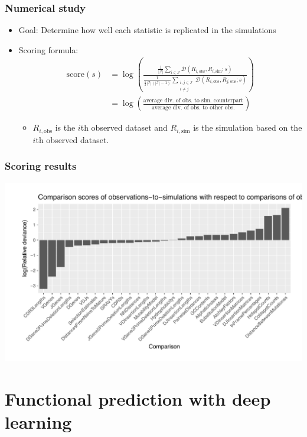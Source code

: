 \documentclass[mathserif,compress]{beamer}
\newcommand*\ba{\[ \begin{aligned}}
\newcommand*\ea{\end{aligned} \]}
\renewcommand\;{\,}
\begin{document}
\begin{frame}\frametitle{Numerical study }
\begin{itemize}
\item
Goal: Determine how well each statistic is replicated in the simulations
\bigskip
\item
Scoring formula:
\ba
\text{score}(s) & =
\log \left( \frac{ \frac{1}{|\mathcal I|} \sum_{i \in \mathcal I} \mathcal D \left( R_{i, \text{obs}}, R_{i, \text{sim}} ; s\right) }
    { \frac{1}{\frac{1}{2} |\mathcal I|\left(|\mathcal I| - 1\right)}
        \sum_{\substack{i, j \in \mathcal I \\ i \ne j}} \mathcal D\left(R_{i, \text{obs}}, R_{j, \text{obs}}; s\right) } \right) \\
	& = \log \left( \frac{ \text{average div. of obs. to sim. counterpart} }
					{ \text{average div. of obs. to other obs.} } \right)
\ea 
\begin{itemize}
\item
$R_{i, \text{obs}}$ is the $i$th observed dataset and $R_{i, \text{sim}}$ is the simulation based on the $i$th observed dataset.  
\end{itemize}
\end{itemize}
\end{frame}

\begin{frame}\frametitle{Scoring results}
\begin{center}
\includegraphics[width=\linewidth]{Images/score_plot.pdf}
\end{center}
\end{frame}

\section{Functional prediction with deep learning}
\end{document}

